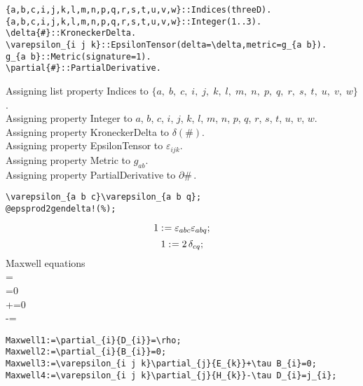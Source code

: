 \documentclass[11pt]{article}
\def\specialcolon{\mathrel{\mathop{:}}\hspace{-.5em}}
\begin{document}
{\color[named]{Blue}\begin{verbatim}
{a,b,c,i,j,k,l,m,n,p,q,r,s,t,u,v,w}::Indices(threeD).
{a,b,c,i,j,k,l,m,n,p,q,r,s,t,u,v,w}::Integer(1..3).
\delta{#}::KroneckerDelta.
\varepsilon_{i j k}::EpsilonTensor(delta=\delta,metric=g_{a b}).
g_{a b}::Metric(signature=1).
\partial{#}::PartialDerivative.
\end{verbatim}}
Assigning list property Indices to $\{a,\; b,\; c,\; i,\; j,\; k,\; l,\; m,\; n,\; p,\; q,\; r,\; s,\; t,\; u,\; v,\; w\}$.
\\
Assigning property Integer to $a$, $b$, $c$, $i$, $j$, $k$, $l$, $m$, $n$, $p$, $q$, $r$, $s$, $t$, $u$, $v$, $w$.
\\
Assigning property KroneckerDelta to $\delta(\#)$.
\\
Assigning property EpsilonTensor to ${\varepsilon}_{i j k}$.
\\
Assigning property Metric to ${g}_{a b}$.
\\
Assigning property PartialDerivative to $\partial{\#}\, $.
\\
{\color[named]{Blue}\begin{verbatim}
\varepsilon_{a b c}\varepsilon_{a b q};
@epsprod2gendelta!(%);
\end{verbatim}}
\begin{dmath*}[compact, spread=2pt]
1\specialcolon{}= {\varepsilon}_{a b c} {\varepsilon}_{a b q};
\end{dmath*}
\begin{dmath*}[compact, spread=2pt]
1\specialcolon{}= 2\, {\delta}_{c q};
\end{dmath*}
Maxwell equations
\\
=\rho\\
=0\\
+=0\\
-=
{\color[named]{Blue}\begin{verbatim}
Maxwell1:=\partial_{i}{D_{i}}=\rho;
Maxwell2:=\partial_{i}{B_{i}}=0;
Maxwell3:=\varepsilon_{i j k}\partial_{j}{E_{k}}+\tau B_{i}=0;
Maxwell4:=\varepsilon_{i j k}\partial_{j}{H_{k}}-\tau D_{i}=j_{i};
\end{verbatim}}
\end{document}
